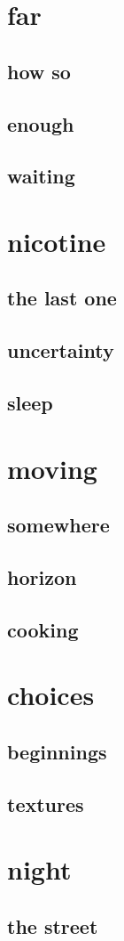 \documentclass{article}
\begin{document}
\section{far}
\subsection{how so}

\clearpage
\subsection{enough}

\clearpage
\subsection{waiting}

\clearpage

\section{nicotine}
\subsection{the last one}

\clearpage
\subsection{uncertainty}

\clearpage
\subsection{sleep}

\clearpage


\section{moving}
\subsection{somewhere}

\clearpage
\subsection{horizon}

\clearpage
\subsection{cooking}
\clearpage

\section{choices}
\subsection{beginnings}

\clearpage
\subsection{textures}


\section{night}
\subsection{the street}

\clearpage
\end{document}
